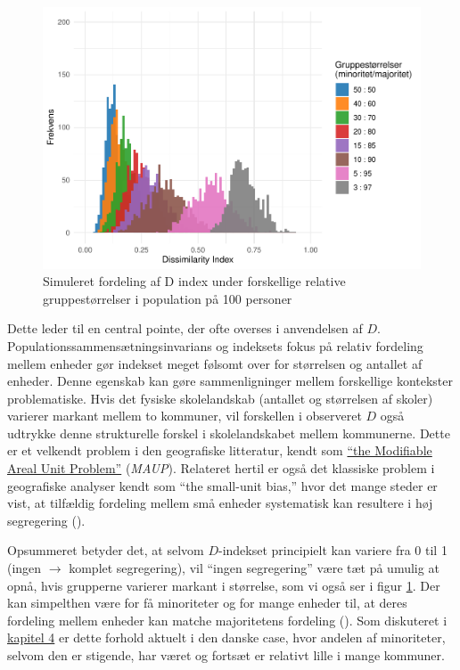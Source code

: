 \documentclass[
]{book}
\begin{document}
\begin{figure}
\includegraphics[width=1\linewidth]{en-befolkning-blander-sig_files/figure-latex/fig-9-1-1} \caption{Simuleret fordeling af D index under forskellige relative gruppestørrelser i population på 100 personer}\label{fig:fig-9-1}
\end{figure}

Dette leder til en central pointe, der ofte overses i anvendelsen af \(D\). Populationssammensætningsinvarians og indeksets fokus på relativ fordeling mellem enheder gør indekset meget følsomt over for størrelsen og antallet af enheder. Denne egenskab kan gøre sammenligninger mellem forskellige kontekster problematiske. Hvis det fysiske skolelandskab (antallet og størrelsen af skoler) varierer markant mellem to kommuner, vil forskellen i observeret \(D\) også udtrykke denne strukturelle forskel i skolelandskabet mellem kommunerne. Dette er et velkendt problem i den geografiske litteratur, kendt som \href{https://en.wikipedia.org/wiki/Modifiable_areal_unit_problem}{``the Modifiable Areal Unit Problem''} (\emph{MAUP}). Relateret hertil er også det klassiske problem i geografiske analyser kendt som ``the small-unit bias,'' hvor det mange steder er vist, at tilfældig fordeling mellem små enheder systematisk kan resultere i høj segregering ().

Opsummeret betyder det, at selvom \(D\)-indekset principielt kan variere fra 0 til 1 (ingen \(\rightarrow\) komplet segregering), vil ``ingen segregering'' være tæt på umulig at opnå, hvis grupperne varierer markant i størrelse, som vi også ser i figur \ref{fig:fig-9-1}. Der kan simpelthen være for få minoriteter og for mange enheder til, at deres fordeling mellem enheder kan matche majoritetens fordeling (). Som diskuteret i \hyperref[kap4]{kapitel 4} er dette forhold aktuelt i den danske case, hvor andelen af minoriteter, selvom den er stigende, har været og fortsæt er relativt lille i mange kommuner.
\end{document}
